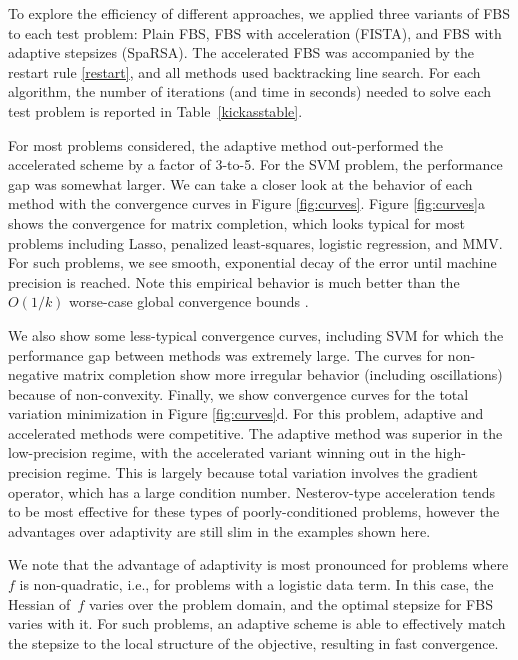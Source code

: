 \documentclass{amsart}
\theoremstyle{definition}
\begin{document}
To explore the efficiency of different approaches, we applied three variants of FBS to each test problem:  Plain FBS, FBS with acceleration (FISTA), and FBS with adaptive stepsizes (SpaRSA).   The accelerated FBS was accompanied by the restart rule \eqref{restart}, and all methods used backtracking line search. 
For each algorithm, the number of iterations (and time in seconds) needed to solve each test problem is reported in Table~\ref{kickasstable}.   

 For most problems considered,  the adaptive method out-performed the accelerated scheme by a factor of 3-to-5. For the SVM problem, the performance gap was somewhat larger.    We can take a closer look at the behavior of each method with the convergence curves in Figure \ref{fig:curves}.  Figure \ref{fig:curves}a shows the convergence for matrix completion, which looks typical for most problems including Lasso, penalized least-squares, logistic regression, and MMV.  For such problems, we see smooth, exponential decay of the error until machine precision is reached.  Note this empirical behavior is much better than the $O(1/k)$  worse-case global convergence bounds \cite{BT09}. 
 
 We also show some less-typical convergence curves, including SVM for which the performance gap between methods was extremely large.  The curves for non-negative matrix completion show more irregular behavior (including oscillations) because of non-convexity.   Finally, we show convergence curves for the total variation minimization in Figure \ref{fig:curves}d.  For this problem, adaptive and accelerated methods were competitive.  The adaptive method was superior in the low-precision regime, with the accelerated variant winning out in the high-precision regime.  This is largely because total variation involves the gradient operator, which has a large condition number.  Nesterov-type acceleration tends to be most effective for these types of poorly-conditioned problems, however the advantages over adaptivity are still slim in the examples shown here.

We note that the advantage of adaptivity is most pronounced for problems where $f$ is non-quadratic, i.e., for problems with a logistic data term.  In this case, the Hessian of~$f$ varies over the problem domain, and the optimal stepsize for FBS varies with it.  For such problems, an adaptive scheme is able to effectively match the stepsize to the local structure of the objective, resulting in fast convergence.
\end{document}
